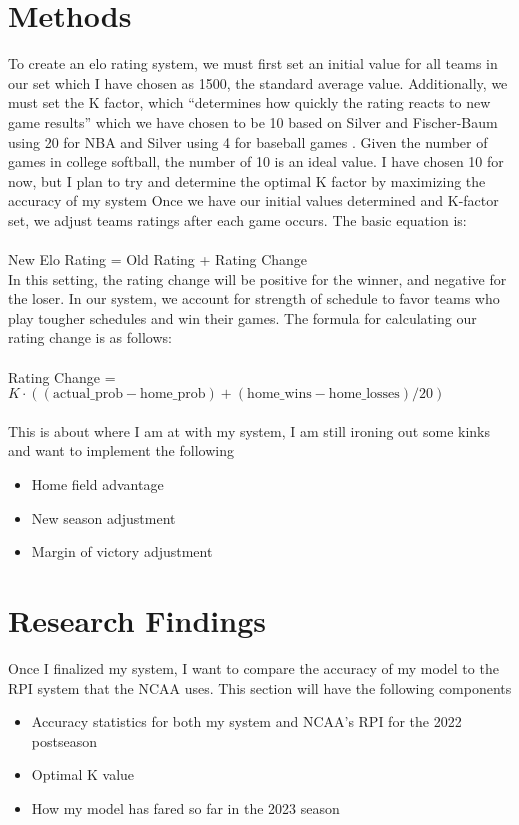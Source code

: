 \documentclass{article}
\begin{document}
\section{\textbf{Methods}}
To create an elo rating system, we must first set an initial value for all teams in our set which I have chosen as 1500, the standard average value. Additionally, we must set the K factor, which “determines how quickly the rating reacts to new game results” \citet{silver2014nbaelo} which we have chosen to be 10 based on Silver and Fischer-Baum using 20 for NBA and Silver using 4 for baseball games \cite{baseballprospectus}. Given the number of games in college softball, the number of 10 is an ideal value. 
I have chosen 10 for now, but I plan to try and determine the optimal K factor by maximizing the accuracy of my system
	Once we have our initial values determined and K-factor set, we adjust teams ratings after each game occurs. The basic equation is:\\
\\New Elo Rating = Old Rating + Rating Change\\

In this setting, the rating change will be positive for the winner, and negative for the loser. In our system, we account for strength of schedule to favor teams who play tougher schedules and win their games. The formula for calculating our rating change is as follows:\\
\\Rating Change = $K \cdot ((\text{actual\_prob}-\text{home\_prob}) + (\text{home\_wins}-\text{home\_losses})/20)$
\\
\\This is about where I am at with my system, I am still ironing out some kinks and want to implement the following
\begin{itemize}
    \item Home field advantage
    \item New season adjustment
    \item Margin of victory adjustment
\end{itemize}

\section{\textbf{Research Findings}}
	Once I finalized my system, I want to compare the accuracy of my model to the RPI system that the NCAA uses. This section will have the following components
 \begin{itemize}
    \item Accuracy statistics for both my system and NCAA’s RPI for the 2022 postseason
    \item Optimal K value
    \item How my model has fared so far in the 2023 season
\end{itemize}
\end{document}
